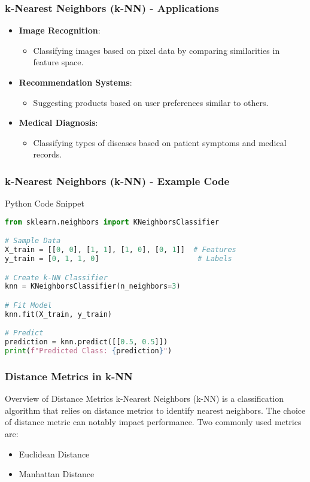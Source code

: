 \documentclass[aspectratio=169]{beamer}
\begin{document}
\begin{frame}
  \frametitle{k-Nearest Neighbors (k-NN) - Applications}
  \begin{itemize}
    \item \textbf{Image Recognition}:
      \begin{itemize}
        \item Classifying images based on pixel data by comparing similarities in feature space.
      \end{itemize}
    \item \textbf{Recommendation Systems}:
      \begin{itemize}
        \item Suggesting products based on user preferences similar to others.
      \end{itemize}
    \item \textbf{Medical Diagnosis}:
      \begin{itemize}
        \item Classifying types of diseases based on patient symptoms and medical records.
      \end{itemize}
  \end{itemize}
\end{frame}

\begin{frame}[fragile]
  \frametitle{k-Nearest Neighbors (k-NN) - Example Code}
  \begin{block}{Python Code Snippet}
    \begin{lstlisting}[language=Python]
from sklearn.neighbors import KNeighborsClassifier

# Sample Data
X_train = [[0, 0], [1, 1], [1, 0], [0, 1]]  # Features
y_train = [0, 1, 1, 0]                       # Labels

# Create k-NN Classifier
knn = KNeighborsClassifier(n_neighbors=3)

# Fit Model
knn.fit(X_train, y_train)

# Predict
prediction = knn.predict([[0.5, 0.5]])
print(f"Predicted Class: {prediction}")
    \end{lstlisting}
  \end{block}
\end{frame}

\begin{frame}[fragile]
  \frametitle{Distance Metrics in k-NN}
  
  \begin{block}{Overview of Distance Metrics}
    k-Nearest Neighbors (k-NN) is a classification algorithm that relies on distance metrics to identify nearest neighbors. The choice of distance metric can notably impact performance. Two commonly used metrics are:
    \begin{itemize}
      \item Euclidean Distance
      \item Manhattan Distance
    \end{itemize}
  \end{block}
\end{frame}
\end{document}
